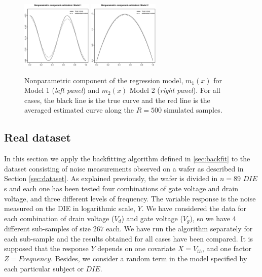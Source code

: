\documentclass[sn-mathphys]{sn-jnl}%
\theoremstyle{thmstyleone}%
\theoremstyle{thmstyletwo}%
\theoremstyle{thmstylethree}%
\begin{document}
\begin{figure}[H]
	\centerline{\includegraphics [width=0.3\textwidth]{Fig12_sim1.eps}
		          \includegraphics [width=0.3\textwidth]{Fig12_sim2.eps} }
	\caption{Nonparametric component of the regression model,  $m_1(x)$ for Model 1 ({\it left panel}) and $m_2(x)$ Model 2 ({\it right panel}). For all cases, the black line is the true curve and the red line is the averaged estimated curve along the $R=500$ simulated samples.}
	\label{fig:estim_m}
\end{figure}

\subsection{Real dataset}\label{sec:bf_noise}

In this section we apply the backfitting algorithm defined in \ref{sec:backfit} to the dataset consisting of noise measurements observed on a wafer as  described in Section \ref{sec:dataset}. As explained previously, the wafer is divided in $n=89$ $DIE$s and each one has been tested four combinations of gate voltage and drain voltage, and three different levels of frequency. 
The variable response is the noise measured on the DIE in logarithmic scale, $Y$. We have considered the data for each combination of drain voltage ($V_d$) and gate voltage ($V_g$), so we have 4 different sub-samples of size $267$ each. We have run the algorithm separately for each sub-sample and the results obtained for all cases have been compared. 
  It is supposed that the response $Y$ depends on one covariate $X=V_{th}$, and one factor $Z=Frequency$. Besides, we consider a random term in the model specified by each particular subject or $DIE$.
\end{document}
